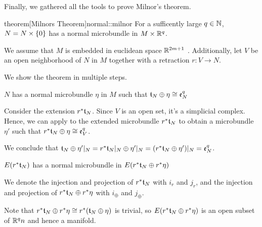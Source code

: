 \begin{scope}
    \newcommand{\rwhitney} {
        \whitney{\ind{r}\bt_N}{\ind{r}\eta}
    }
    \newcommand{\rtn} {
        \ind{r}\bt_N
    }

    \begin{myparagraph}
        Finally, we gathered all the tools to prove Milnor's theorem.
    \end{myparagraph}

    \begin{mystatement}{theorem}[Milnors Theorem]{normal::milnor}
        For a sufficently large $q \in \N$, $N = \cyldown{N}$ has a normal microbundle in $M \cross \R^q$.
    \end{mystatement}

    \begin{myproof}
        We assume that $M$ is embedded in euclidean space $\R^{2m + 1}$ \cite[p.60]{dimension}.
        Additionally, let $V$ be an open neighborhood of $N$ in $M$ together with a retraction $r: V \to N$.

        We show the theorem in multiple steps.
        \begin{steps}
            \item $N$ has a normal microbundle $\eta$ in $M$ such that $\whitney{\bt_N}{\eta} \cong \be[q]{N}$
            
            Consider the extension $\ind{r}\bt_N$.
            Since $V$ is an open set, it's a simplicial complex.
            Hence, we can apply  to the extended microbundle $\ind{r}\bt_N$
            to obtain a microbundle $\eta'$ such that $\whitney{\ind{r}\bt_N}{\eta} \cong \be[q]{V}$.

            We conclude that $\whitney{\bt_N}{\eta'\restr{N}} = \whitney{\ind{r}\bt_N\restr{N}}{\eta'\restr{N}} = (\whitney{\ind{r}\bt_N}{\eta'})\restr{N} = \be[q]{N}$.

            \item $E(\rtn)$ has a normal microbundle in $E(\rwhitney)$

            We denote the injection and projection of $\rtn$ with $i_r$ and $j_r$,
            and the injection and projection of $\rwhitney$ with $i_\oplus$ and $j_\oplus$.

            Note that $\rwhitney \cong \ind{r}(\whitney{\bt_N}{\eta})$ is trivial, so
            $E(\rwhitney)$ is an open subset of $\R^qn$ and hence a manifold.


\end{steps}
\end{myproof}
\end{scope}
